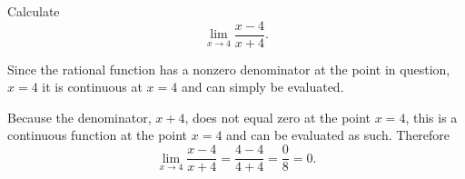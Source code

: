 \documentclass{ximera}
\author{Emma Smith Zbarsky}
\begin{document}
\begin{exercise}

Calculate \[\lim_{x\to 4} \frac{x-4}{x+4}.\]


\begin{hint}
Since the rational function has a nonzero denominator at the point in
question, $x=4$ it is continuous at $x=4$ and can simply be evaluated.
\end{hint}


\begin{hint}
Because the denominator, $x+4$, does not equal zero at the point $x=4$,
this is a continuous function at the point $x=4$ and can be evaluated as
such. Therefore
\[\lim_{x\to 4} \frac{x-4}{x+4} = \frac{4-4}{4+4} = \frac{0}{8} = 0.\]
\end{hint}


\begin{multipleChoice}
\choice{$\infty$}
\choice{$-\infty$}
\end{multipleChoice}

\end{exercise}
\end{document}
